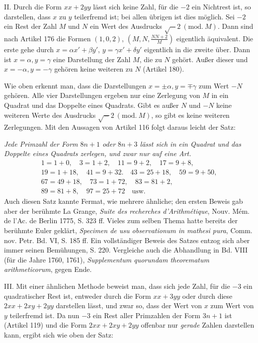 II. Durch die Form $xx+2yy$ lässt sich keine Zahl, für die $-2$ ein Nichtrest ist, so darstellen, dass $x$ zu $y$ teilerfremd ist; bei allen übrigen ist dies möglich. Sei $-2$ ein Rest der Zahl $M$ und $N$ ein Wert des Ausdrucks $\surd-2\ (\mathrm{mod.}\ M)$. Dann sind nach Artikel 176 die Formen $(1,0,2)$, $(M,N,\frac{NN+2}{M})$ eigentlich äquivalent. Die erste gehe durch $x=\alpha x'+\beta y'$, $y=\gamma x'+\delta y'$ eigentlich in die zweite über. Dann ist $x=\alpha,y=\gamma$ eine Darstellung der Zahl $M$, die zu $N$ gehört. Außer dieser und $x=-\alpha,y=-\gamma$ gehören keine weiteren zu $N$ (Artikel 180).

Wie oben erkennt man, dass die Darstellungen $x=\pm\alpha,y=\mp\gamma$ zum Wert $-N$ gehören. Alle vier Darstellungen ergeben nur eine Zerlegung von $M$ in ein Quadrat und das Doppelte eines Quadrats. Gibt es außer $N$ und $-N$ keine weiteren Werte des Ausdrucks $\surd-2\ (\mathrm{mod.}\ M)$, so gibt es keine weiteren Zerlegungen. Mit den Aussagen von Artikel 116 folgt daraus leicht der Satz:

\textit{Jede Primzahl der Form $8n+1$ oder $8n+3$ lässt sich in ein Quadrat und das Doppelte eines Quadrats zerlegen, und zwar nur auf eine Art.}
\[
\begin{gathered}
1=1+0,\quad3=1+2,\quad11=9+2,\quad17=9+8,\\
19=1+18,\quad41=9+32.\quad43=25+18,\quad59=9+50,\\
67=49+18,\quad73=1+72,\quad83=81+2,\\
89=81+8,\quad97=25+72\quad\text{usw.}
\end{gathered}
\]
Auch diesen Satz kannte Fermat, wie mehrere ähnliche; den ersten Beweis gab aber der berühmte La Grange, \textit{Suite des recherches d'Arithmétique}, Nouv. Mém. de l'Ac. de Berlin 1775, S. 323 ff. Vieles zum selben Thema hatte bereits der berühmte Euler geklärt, \textit{Specimen de usu observationum in mathesi pura}, Comm. nov. Petr. Bd. VI, S. 185 ff. Ein vollständiger Beweis des Satzes entzog sich aber immer seinen Bemühungen, S. 220. Vergleiche auch die Abhandlung in Bd. VIII (für die Jahre 1760, 1761), \textit{Supplementum quorundam theorematum arithmeticorum}, gegen Ende.

III. Mit einer ähnlichen Methode beweist man, dass sich jede Zahl, für die $-3$ ein quadratischer Rest ist, entweder durch die Form $xx+3yy$ oder durch diese $2xx+2xy+2yy$ darstellen lässt, und zwar so, dass der Wert von $x$ zum Wert von $y$ teilerfremd ist. Da nun $-3$ ein Rest aller Primzahlen der Form $3n+1$ ist (Artikel 119) und die Form $2xx+2xy+2yy$ offenbar nur \textit{gerade} Zahlen darstellen kann, ergibt sich wie oben der Satz:

